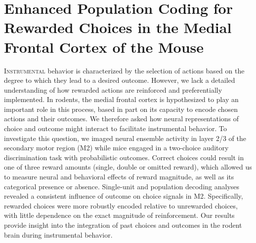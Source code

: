 \chapter{Enhanced Population Coding for Rewarded Choices in the Medial Frontal Cortex of the Mouse}


\lettrine[lines=3]{I}{nstrumental} behavior is characterized by the selection of actions based on the degree to which they lead to a desired outcome. However, we lack a detailed understanding of how rewarded actions are reinforced and preferentially implemented. In rodents, the medial frontal cortex is hypothesized to play an important role in this process, based in part on its capacity to encode chosen actions and their outcomes. We therefore asked how neural representations of choice and outcome might interact to facilitate instrumental behavior. To investigate this question, we imaged neural ensemble activity in layer 2/3 of the secondary motor region (M2) while mice engaged in a two-choice auditory discrimination task with probabilistic outcomes. Correct choices could result in one of three reward amounts (single, double or omitted reward), which allowed us to measure neural and behavioral effects of reward magnitude, as well as its categorical presence or absence. Single-unit and population decoding analyses revealed a consistent influence of outcome on choice signals in M2. Specifically, rewarded choices were more robustly encoded relative to unrewarded choices, with little dependence on the exact magnitude of reinforcement. Our results provide insight into the integration of past choices and outcomes in the rodent brain during instrumental behavior. 
\clearpage










